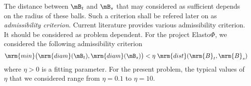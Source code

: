 The distance between $\mB_{t}$ and $\mB_{s}$ that may considered as sufficient depends on the radius of these balls. 
Such a criterion shall be refered later on as \textit{admissibility criterion}. Current literature provides various 
admissibility criterion. It should be considered as problem dependent. For the project Elasto$\Phi$, we considered the 
following admissibility criterion
\begin{equation}\label{AdmissibilityCondition}
\mrm{min}\big( \mrm{diam}(\mB_{t}),\mrm{diam}(\mB_{s})\big)< \eta\;\mrm{dist}(\mrm{B}_{t},\mrm{B}_{s})
\end{equation}
where $\eta>0$ is a fitting parameter. For the present problem, the typical values of $\eta$ that we considered  
range from $\eta = 0.1$ to $\eta = 10$.






